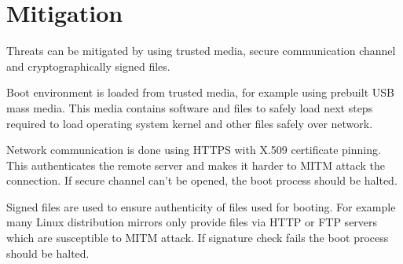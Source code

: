 \section{Mitigation}

Threats can be mitigated by using trusted media, secure communication
channel and cryptographically signed files.

Boot environment is loaded from trusted media, for example using
prebuilt USB mass media. This media contains software and files to
safely load next steps required to load operating system kernel and
other files safely over network.

Network communication is done using HTTPS with X.509 certificate
pinning. This authenticates the remote server and makes it harder to
MITM attack the connection. If secure channel can't be opened, the
boot process should be halted.

Signed files are used to ensure authenticity of files used for
booting. For example many Linux distribution mirrors only provide
files via HTTP or FTP servers which are susceptible to MITM attack. If
signature check fails the boot process should be halted.

